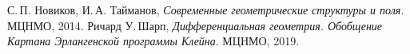 \begin{thebibliography}{9}
	 С.\,П. Новиков, И.\,А. Тайманов, \textit{Современные геометрические структуры и поля}. МЦНМО, 2014.
	 Ричард У.\,Шарп, \textit{Дифференциальная геометрия. Обобщение Картана Эрлангенской программы Клейна}. МЦНМО, 2019.
\end{thebibliography}

